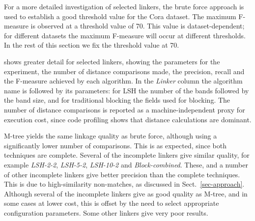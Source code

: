 \documentclass{llncs}
\begin{document}
For a more detailed investigation of selected linkers, the brute force
approach is used to establish a good threshold value for the Cora
dataset. The maximum F-measure is observed at a threshold value of
70. This value is dataset-dependent; for different datasets the maximum
F-measure will occur at different thresholds. In the rest of this
section we fix the threshold value at 70.

 shows greater detail for selected
linkers, showing the parameters for the experiment, the number of
distance comparisons made, the precision, recall and the F-measure
achieved by each algorithm.  In the \emph{Linker} column the algorithm
name is followed by its parameters: for LSH the number of the bands
followed by the band size, and for traditional blocking the fields used
for blocking. The number of distance comparisons is reported as a
machine-independent proxy for execution cost, since code profiling shows
that distance calculations are dominant.

M-tree yields the same linkage quality as brute force, although using a
significantly lower number of comparisons. This is as expected, since
both techniques are complete. Several of the incomplete linkers give
similar quality, for example \emph{LSH-2-2}, \emph{LSH-5-2},
\emph{LSH-10-2} and \emph{Block-combined}. These, and a number of other
incomplete linkers give better precision than the complete techniques.
This is due to high-similarity non-matches, as discussed in
Sect.~\ref{sec-approach}. Although several of the incomplete linkers
give as good quality as M-tree, and in some cases at lower cost, this is
offset by the need to select appropriate configuration parameters. Some
other linkers give very poor results.

\end{document}
